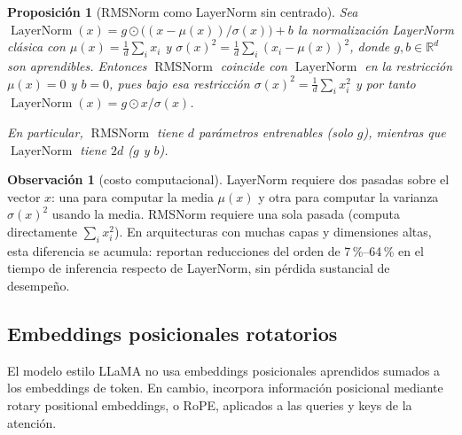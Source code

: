 \documentclass[11pt]{report}
\newenvironment{tcolorbox}[1][]{\par\medskip\noindent\ignorespaces}{\par\medskip}
\theoremstyle{definition}
\newtheorem{observacion}[definicion]{Observación}
\theoremstyle{plain}
\newtheorem{proposicion}[definicion]{Proposición}
\numberwithin{equation}{section}
\newcommand{\R}{\mathbb{R}}
\newcommand{\LN}{\operatorname{LayerNorm}}
\newcommand{\RMSN}{\operatorname{RMSNorm}}
\begin{document}
\begin{tcolorbox}[colback=blue!8, colframe=blue!8, boxrule=0pt]
\begin{proposicion}[RMSNorm como LayerNorm sin centrado]
Sea \(\LN(x)=g\odot\bigl((x-\mu(x))/\sigma(x)\bigr)+b\) la normalización LayerNorm clásica con \(\mu(x)=\tfrac1d\sum_i x_i\) y \(\sigma(x)^2=\tfrac1d\sum_i (x_i-\mu(x))^2\), donde \(g,b\in\R^d\) son aprendibles. Entonces \(\RMSN\) coincide con \(\LN\) en la restricción \(\mu(x)=0\) y \(b=0\), pues bajo esa restricción \(\sigma(x)^2=\tfrac1d\sum_i x_i^2\) y por tanto \(\LN(x)=g\odot x/\sigma(x)\).

En particular, \(\RMSN\) tiene \(d\) parámetros entrenables (solo \(g\)), mientras que \(\LN\) tiene \(2d\) (\(g\) y \(b\)).
\end{proposicion}
\end{tcolorbox}

\begin{observacion}[costo computacional]
LayerNorm requiere dos pasadas sobre el vector \(x\): una para computar la media \(\mu(x)\) y otra para computar la varianza \(\sigma(x)^2\) usando la media. RMSNorm requiere una sola pasada (computa directamente \(\sum_i x_i^2\)). En arquitecturas con muchas capas y dimensiones altas, esta diferencia se acumula: \citet{zhang-sennrich-2019-rmsnorm} reportan reducciones del orden de 7\,\%--64\,\% en el tiempo de inferencia respecto de LayerNorm, sin pérdida sustancial de desempeño.
\end{observacion}

\subsection{Embeddings posicionales rotatorios}

El modelo estilo LLaMA no usa embeddings posicionales aprendidos sumados a los embeddings de token. En cambio, incorpora información posicional mediante rotary positional embeddings, o RoPE, aplicados a las queries y keys de la atención.
\end{document}
